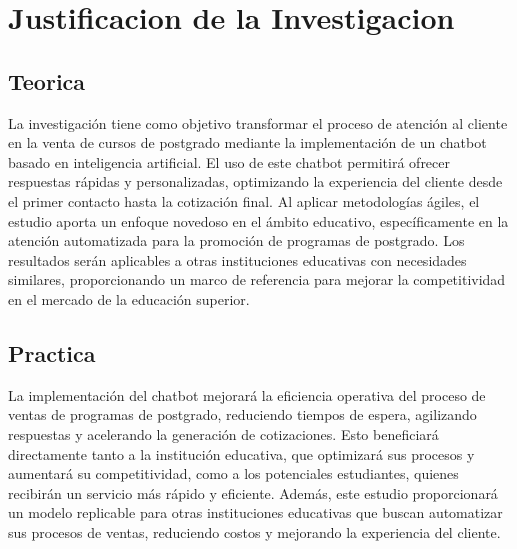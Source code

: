 \documentclass[10pt,a4paper]{article}
\begin{document}
	
	\section{Justificacion de la Investigacion}
		    
	\subsection{Teorica}

	La investigación tiene como objetivo transformar el proceso de atención al cliente en la venta de cursos de postgrado mediante la implementación de un chatbot basado en inteligencia artificial. El uso de este chatbot permitirá ofrecer respuestas rápidas y personalizadas, optimizando la experiencia del cliente desde el primer contacto hasta la cotización final. Al aplicar metodologías ágiles, el estudio aporta un enfoque novedoso en el ámbito educativo, específicamente en la atención automatizada para la promoción de programas de postgrado. Los resultados serán aplicables a otras instituciones educativas con necesidades similares, proporcionando un marco de referencia para mejorar la competitividad en el mercado de la educación superior.

 

    \subsection{Practica}
	La implementación del chatbot mejorará la eficiencia operativa del proceso de ventas de programas de postgrado, reduciendo tiempos de espera, agilizando respuestas y acelerando la generación de cotizaciones. Esto beneficiará directamente tanto a la institución educativa, que optimizará sus procesos y aumentará su competitividad, como a los potenciales estudiantes, quienes recibirán un servicio más rápido y eficiente. Además, este estudio proporcionará un modelo replicable para otras instituciones educativas que buscan automatizar sus procesos de ventas, reduciendo costos y mejorando la experiencia del cliente.

  
\end{document}
